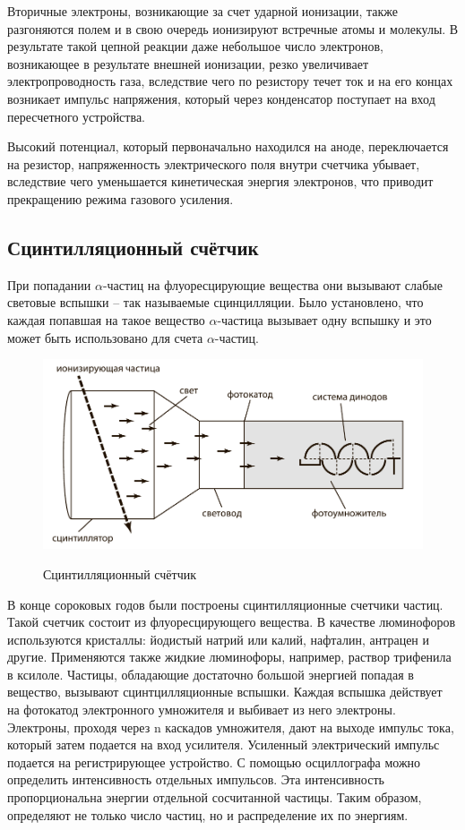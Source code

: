 \documentclass[14pt,pscyr,titlepage]{hedreport}
\begin{document}
		Вторичные электроны, возникающие за счет  ударной ионизации, также 
		разгоняются полем и в свою очередь ионизируют встречные атомы и 
		молекулы. В результате такой цепной реакции даже небольшое число 
		электронов, возникающее в результате внешней ионизации, резко 
		увеличивает электропроводность  газа, вследствие чего по резистору 
		течет ток и на его концах возникает импульс напряжения, который через 
		конденсатор поступает на вход пересчетного устройства.

		Высокий потенциал, который первоначально находился на аноде, 
		переключается на резистор, напряженность электрического поля внутри 
		счетчика убывает, вследствие чего уменьшается кинетическая энергия 
		электронов, что приводит прекращению режима газового усиления.

	\subsection{Сцинтилляционный счётчик}
		При попадании \( \alpha \)-частиц на флуоресцирующие вещества они 
		вызывают слабые световые вспышки -- так называемые сцинцилляции. Было 
		установлено, что каждая попавшая на такое вещество 
		\( \alpha \)-частица вызывает одну вспышку и это может быть 
		использовано для счета \( \alpha \)-частиц.

		\begin{figure}[h!]
			\center
			\includegraphics[width=.8\textwidth]{scintillascope} \\
			\caption{Сцинтилляционный счётчик}
		\end{figure}

		В конце сороковых годов были построены сцинтилляционные счетчики частиц. 
		Такой счетчик состоит из флуоресцирующего вещества. В качестве 
		люминофоров используются кристаллы: йодистый натрий или калий, 
		нафталин, антрацен и другие. Применяются также жидкие люминофоры, 
		например, раствор трифенила в ксилоле. Частицы, обладающие достаточно 
		большой энергией попадая в вещество, вызывают сцинтцилляционные 
		вспышки. Каждая вспышка действует на фотокатод электронного умножителя 
		и выбивает из него электроны. Электроны, проходя через n каскадов 
		умножителя, дают на выходе импульс тока, который затем подается на 
		вход усилителя. Усиленный электрический импульс подается на 
		регистрирующее устройство. С помощью осциллографа можно определить 
		интенсивность отдельных импульсов. Эта интенсивность пропорциональна 
		энергии отдельной сосчитанной частицы. Таким образом, определяют не 
		только число частиц, но и распределение их по энергиям. 
\end{document}
